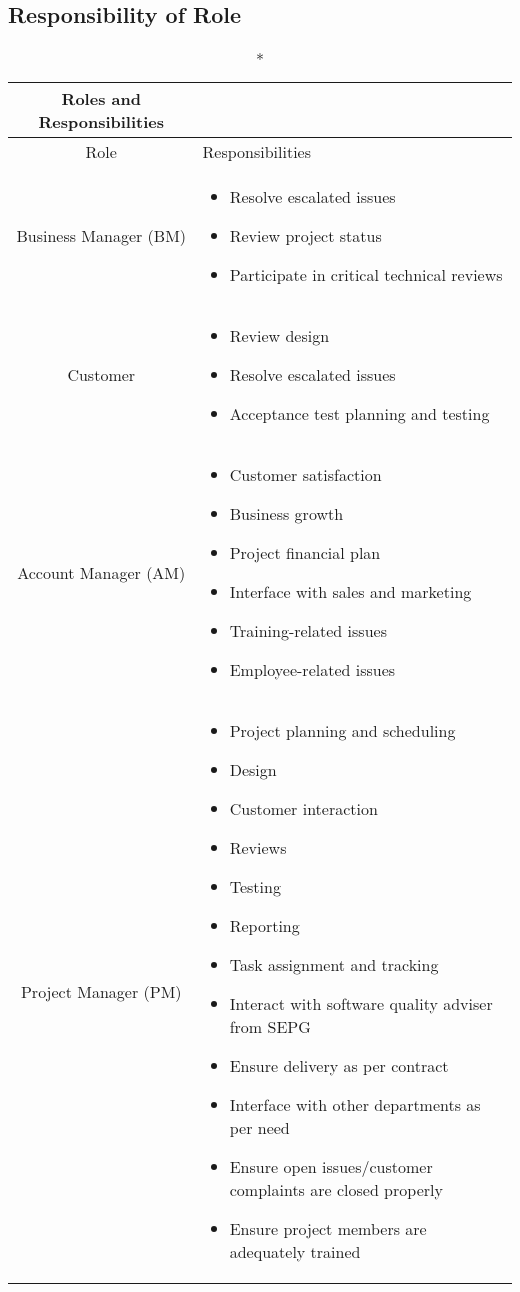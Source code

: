 \documentclass[a4paper,11pt]{article}
\begin{document}
\subsection{Responsibility of Role}
\begin{center}
\begin{longtable}{|S|T|}
\caption*{Roles and Responsibilities} \\

\hline Role & Responsibilities \\

\hline Business Manager (BM) &
    \begin{itemize}
    \item Resolve escalated issues
    \item Review project status
    \item Participate in critical technical reviews
    \end{itemize} \\
    
\hline Customer &
    \begin{itemize}
    \item Review design
    \item Resolve escalated issues
    \item Acceptance test planning and testing
    \end{itemize} \\
    
\hline Account Manager (AM) &
    \begin{itemize}
    \item Customer satisfaction
    \item Business growth
    \item Project financial plan
    \item Interface with sales and marketing
    \item Training-related issues
    \item Employee-related issues
    \end{itemize} \\
    
\hline Project Manager (PM) &
    \begin{itemize}
    \item Project planning and scheduling
    \item Design
    \item Customer interaction
    \item Reviews
    \item Testing
    \item Reporting
    \item Task assignment and tracking
    \item Interact with software quality adviser from SEPG
    \item Ensure delivery as per contract
    \item Interface with other departments as per need
    \item Ensure open issues/customer complaints are closed properly
    \item Ensure project members are adequately trained
    \end{itemize} \\
    

\end{longtable}
\end{center}
\end{document}
